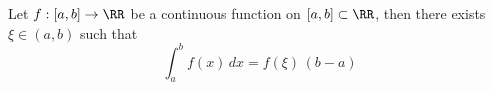 

\begin{theorem}

Let $f:[a,b]\to\RR$ be a continuous function on 
$[a,b]\subset \RR$, then there exists $\xi\in (a,b)$ 
such that 
$$
\int_a^b f(x)\,dx = f(\xi)\,(b-a)
$$

\end{theorem}

